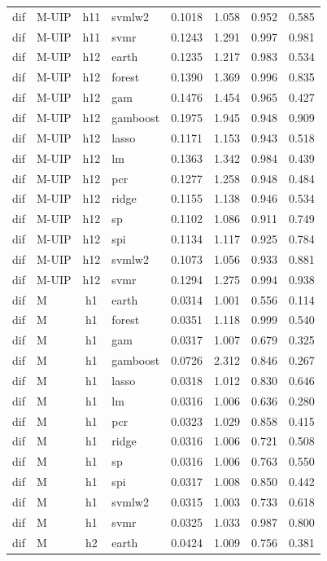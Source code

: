 \begin{ThreePartTable}
\begin{longtable}[t]{llclcccc}
dif & M-UIP & h11 & svmlw2 & 0.1018 & 1.058 & 0.952 & 0.585\\
dif & M-UIP & h11 & svmr & 0.1243 & 1.291 & 0.997 & 0.981\\
\addlinespace
dif & M-UIP & h12 & earth & 0.1235 & 1.217 & 0.983 & 0.534\\
dif & M-UIP & h12 & forest & 0.1390 & 1.369 & 0.996 & 0.835\\
dif & M-UIP & h12 & gam & 0.1476 & 1.454 & 0.965 & 0.427\\
dif & M-UIP & h12 & gamboost & 0.1975 & 1.945 & 0.948 & 0.909\\
dif & M-UIP & h12 & lasso & 0.1171 & 1.153 & 0.943 & 0.518\\
dif & M-UIP & h12 & lm & 0.1363 & 1.342 & 0.984 & 0.439\\
dif & M-UIP & h12 & pcr & 0.1277 & 1.258 & 0.948 & 0.484\\
dif & M-UIP & h12 & ridge & 0.1155 & 1.138 & 0.946 & 0.534\\
dif & M-UIP & h12 & sp & 0.1102 & 1.086 & 0.911 & 0.749\\
dif & M-UIP & h12 & spi & 0.1134 & 1.117 & 0.925 & 0.784\\
dif & M-UIP & h12 & svmlw2 & 0.1073 & 1.056 & 0.933 & 0.881\\
dif & M-UIP & h12 & svmr & 0.1294 & 1.275 & 0.994 & 0.938\\
\addlinespace
dif & M & h1 & earth & 0.0314 & 1.001 & 0.556 & 0.114\\
dif & M & h1 & forest & 0.0351 & 1.118 & 0.999 & 0.540\\
dif & M & h1 & gam & 0.0317 & 1.007 & 0.679 & 0.325\\
dif & M & h1 & gamboost & 0.0726 & 2.312 & 0.846 & 0.267\\
dif & M & h1 & lasso & 0.0318 & 1.012 & 0.830 & 0.646\\
dif & M & h1 & lm & 0.0316 & 1.006 & 0.636 & 0.280\\
dif & M & h1 & pcr & 0.0323 & 1.029 & 0.858 & 0.415\\
dif & M & h1 & ridge & 0.0316 & 1.006 & 0.721 & 0.508\\
dif & M & h1 & sp & 0.0316 & 1.006 & 0.763 & 0.550\\
dif & M & h1 & spi & 0.0317 & 1.008 & 0.850 & 0.442\\
dif & M & h1 & svmlw2 & 0.0315 & 1.003 & 0.733 & 0.618\\
dif & M & h1 & svmr & 0.0325 & 1.033 & 0.987 & 0.800\\
\addlinespace
dif & M & h2 & earth & 0.0424 & 1.009 & 0.756 & 0.381\\

\end{longtable}
\end{ThreePartTable}
